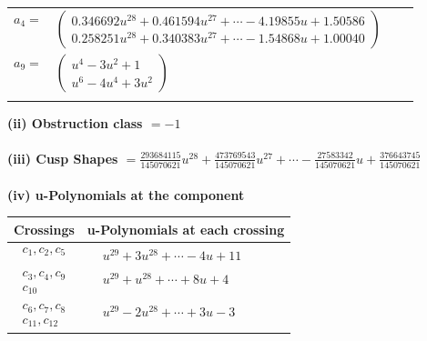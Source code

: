 \documentclass[1p]{elsarticle_modified}
\theoremstyle{definition}
\begin{document}
\begin{tabular}{m{7pt} m{180pt} m{7pt} m{180pt} }
\flushright $a_{4}=$&$\begin{pmatrix}0.346692 u^{28}+0.461594 u^{27}+\cdots-4.19855 u+1.50586\\0.258251 u^{28}+0.340383 u^{27}+\cdots-1.54868 u+1.00040\end{pmatrix}$ \\
\flushright $a_{9}=$&$\begin{pmatrix}u^4-3 u^2+1\\u^6-4 u^4+3 u^2\end{pmatrix}$\\&\end{tabular}
\flushleft \textbf{(ii) Obstruction class $= -1$}\\~\\
\flushleft \textbf{(iii) Cusp Shapes $= \frac{293684115}{145070621} u^{28}+\frac{473769543}{145070621} u^{27}+\cdots-\frac{27583342}{145070621} u+\frac{376643745}{145070621}$}\\~\\
\newpage\renewcommand{\arraystretch}{1}
\flushleft \textbf{(iv) u-Polynomials at the component}\newline \\
\begin{tabular}{m{50pt}|m{274pt}}
Crossings & \hspace{64pt}u-Polynomials at each crossing \\
\hline $$\begin{aligned}c_{1},c_{2},c_{5}\end{aligned}$$&$\begin{aligned}
&u^{29}+3 u^{28}+\cdots-4 u+11
\end{aligned}$\\
\hline $$\begin{aligned}c_{3},c_{4},c_{9}\\c_{10}\end{aligned}$$&$\begin{aligned}
&u^{29}+u^{28}+\cdots+8 u+4
\end{aligned}$\\
\hline $$\begin{aligned}c_{6},c_{7},c_{8}\\c_{11},c_{12}\end{aligned}$$&$\begin{aligned}
&u^{29}-2 u^{28}+\cdots+3 u-3
\end{aligned}$\\
\hline
\end{tabular}\\~\\
\end{document}
